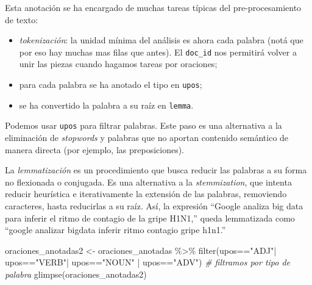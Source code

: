 \documentclass[
]{book}
\newenvironment{Shaded}{\begin{snugshade}}{\end{snugshade}}
\newcommand{\CommentTok}[1]{\textcolor[rgb]{0.56,0.35,0.01}{\textit{#1}}}
\newcommand{\FunctionTok}[1]{\textcolor[rgb]{0.00,0.00,0.00}{#1}}
\newcommand{\NormalTok}[1]{#1}
\newcommand{\OtherTok}[1]{\textcolor[rgb]{0.56,0.35,0.01}{#1}}
\newcommand{\SpecialCharTok}[1]{\textcolor[rgb]{0.00,0.00,0.00}{#1}}
\newcommand{\StringTok}[1]{\textcolor[rgb]{0.31,0.60,0.02}{#1}}
\providecommand{\tightlist}{%
  \setlength{\itemsep}{0pt}\setlength{\parskip}{0pt}}
\begin{document}
Esta anotación se ha encargado de muchas tareas típicas del pre-procesamiento de texto:

\begin{itemize}
\tightlist
\item
  \emph{tokenización}: la unidad mínima del análisis es ahora cada palabra (notá que por eso hay muchas mas filas que antes). El \texttt{doc\_id} nos permitirá volver a unir las piezas cuando hagamos tareas por oraciones;
\item
  para cada palabra se ha anotado el tipo en \texttt{upos};
\item
  se ha convertido la palabra a su raíz en \texttt{lemma}.
\end{itemize}

Podemos usar \texttt{upos} para filtrar palabras. Este paso es una alternativa a la eliminación de \emph{stopwords} y palabras que no aportan contenido semántico de manera directa (por ejemplo, las preposiciones).

La \emph{lemmatización} es un procedimiento que busca reducir las palabras a su forma no flexionada o conjugada. Es una alternativa a la \emph{stemmization}, que intenta reducir heurística e iterativamente la extensión de las palabras, removiendo caracteres, hasta reducirlas a su raíz. Así, la expresión ``Google analiza big data para inferir el ritmo de contagio de la gripe H1N1,'' queda lemmatizada como ``google analizar bigdata inferir ritmo contagio gripe h1n1.''

\begin{Shaded}
\begin{Highlighting}[]
\NormalTok{oraciones\_anotadas2 }\OtherTok{\textless{}{-}}\NormalTok{ oraciones\_anotadas }\SpecialCharTok{\%\textgreater{}\%} 
  \FunctionTok{filter}\NormalTok{(upos}\SpecialCharTok{==}\StringTok{"ADJ"}\SpecialCharTok{|}\NormalTok{ upos}\SpecialCharTok{==}\StringTok{"VERB"}\SpecialCharTok{|}\NormalTok{ upos}\SpecialCharTok{==}\StringTok{"NOUN"} \SpecialCharTok{|}\NormalTok{ upos}\SpecialCharTok{==}\StringTok{"ADV"}\NormalTok{) }\CommentTok{\# filtramos por tipo de palabra}
\FunctionTok{glimpse}\NormalTok{(oraciones\_anotadas2)}
\end{Highlighting}
\end{Shaded}
\end{document}
